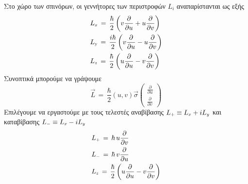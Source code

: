 Στο χώρο των σπινόρων, οι γεννήτορες των περιστροφών $L_i$ αναπαρίστανται ως εξής
\begin{equation}
    \begin{split}
        &L\subscr{x}\,=\,\frac{\hbar}{2}\left( v\frac{\partial}{\partial u}+u\frac{\partial}{\partial v} \right)\\
        &L\subscr{\y}\,=\,\frac{i\hbar}{2}\left( v\frac{\partial}{\partial u}-u\frac{\partial}{\partial v} \right)\\
        &L\subscr{z}\,=\,\frac{\hbar}{2}\left( u\frac{\partial}{\partial u}-v\frac{\partial}{\partial v} \right)
    \end{split}
\end{equation}
Συνοπτικά μπορούμε να γράψουμε
\begin{equation}
    \Vec{L}\,=\,\frac{\hbar}{2}\left( u, v \right)\Vec{\sigma}\left(\begin{array}{c}\frac{\partial}{\partial u}\\\frac{\partial}{\partial v}\end{array}\right)
\end{equation}
Επιλέγουμε να εργαστούμε με τους τελεστές αναβίβασης $L\subscr{+}\equiv L\subscr{x}+iL\subscr{y}$ και καταβίβασης $L\subscr{-}\equiv L\subscr{x}-iL\subscr{y}$
\begin{equation}\label{ladder operators and lz}
    \begin{split}
        &L\subscr{+}\,=\,\hbar\, u\frac{\partial}{\partial v}\\
        &L\subscr{-}\,=\,\hbar\, v\frac{\partial}{\partial u}\\
        &L\subscr{z}\,=\,\frac{\hbar}{2}\left( u\frac{\partial}{\partial u}-v\frac{\partial}{\partial v} \right)
    \end{split}
\end{equation}
